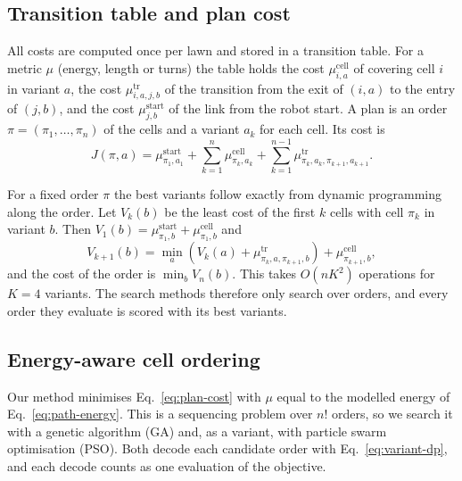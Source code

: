 \subsection{Transition table and plan cost}
\label{sec:method-table}

All costs are computed once per lawn and stored in a transition table.
For a metric $\mu$ (energy, length or turns) the table holds the cost $\mu^{\mathrm{cell}}_{i,a}$ of covering cell $i$ in variant $a$, the cost $\mu^{\mathrm{tr}}_{i,a,j,b}$ of the transition from the exit of $(i,a)$ to the entry of $(j,b)$, and the cost $\mu^{\mathrm{start}}_{j,b}$ of the link from the robot start.
A plan is an order $\pi = (\pi_1, \dots, \pi_n)$ of the cells and a variant $a_k$ for each cell.
Its cost is
\begin{equation}
J(\pi, a) = \mu^{\mathrm{start}}_{\pi_1,a_1} + \sum_{k=1}^{n} \mu^{\mathrm{cell}}_{\pi_k,a_k} + \sum_{k=1}^{n-1} \mu^{\mathrm{tr}}_{\pi_k,a_k,\pi_{k+1},a_{k+1}} .
\label{eq:plan-cost}
\end{equation}

For a fixed order $\pi$ the best variants follow exactly from dynamic programming along the order.
Let $V_k(b)$ be the least cost of the first $k$ cells with cell $\pi_k$ in variant $b$.
Then $V_1(b) = \mu^{\mathrm{start}}_{\pi_1,b} + \mu^{\mathrm{cell}}_{\pi_1,b}$ and
\begin{equation}
V_{k+1}(b) = \min_{a} \left( V_k(a) + \mu^{\mathrm{tr}}_{\pi_k,a,\pi_{k+1},b} \right) + \mu^{\mathrm{cell}}_{\pi_{k+1},b},
\label{eq:variant-dp}
\end{equation}
and the cost of the order is $\min_b V_n(b)$.
This takes $O(n K^2)$ operations for $K = 4$ variants.
The search methods therefore only search over orders, and every order they evaluate is scored with its best variants.

\subsection{Energy-aware cell ordering}
\label{sec:method-ordering}

Our method minimises Eq.~\eqref{eq:plan-cost} with $\mu$ equal to the modelled energy of Eq.~\eqref{eq:path-energy}.
This is a sequencing problem over $n!$ orders, so we search it with a genetic algorithm (GA) and, as a variant, with particle swarm optimisation (PSO).
Both decode each candidate order with Eq.~\eqref{eq:variant-dp}, and each decode counts as one evaluation of the objective.

